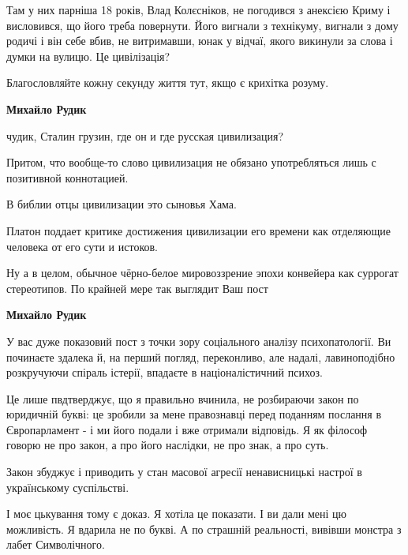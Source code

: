\begin{itemize}
Там у них парніша 18 років, Влад Колєсніков, не погодився з анексією Криму і
висловився, що його треба повернути. Його вигнали з технікуму, вигнали з дому
родичі і він себе вбив, не витримавши, юнак у відчаї, якого викинули за слова і
думки на вулицю. Це цивілізація?

Благословляйте кожну секунду життя тут, якщо є крихітка розуму.

\begin{itemize}

\textbf{Михайло Рудик} 

чудик, Сталин грузин, где он и где русская цивилизация?

Притом, что вообще-то слово цивилизация не обязано употребляться лишь с
позитивной коннотацией.

В библии отцы цивилизации это сыновья Хама.

Платон поддает критике достижения цивилизации его времени как отделяющие
человека от его сути и истоков.

Ну а в целом, обычное чёрно-белое мировоззрение эпохи конвейера как суррогат
стереотипов. По крайней мере так выглядит Ваш пост


\textbf{Михайло Рудик} 

У вас дуже показовий пост з точки зору соціального
аналізу психопатології. Ви починаєте здалека й, на перший погляд, переконливо,
але надалі, лавиноподібно розкручуючи спіраль істерії, впадаєте в
націоналістичний психоз. 

Це лише пвдтверджує, що я правильно вчинила, не розбираючи закон по юридичній
букві: це зробили за мене правознавці перед поданням послання в Європарламент -
і ми його подали і вже отримали відповідь.  Я як філософ говорю не про закон, а
про його наслідки, не про знак, а про суть.

Закон збуджує і приводить у стан масової агресії ненависницькі настрої в
українському суспільстві. 

І моє цькування тому є доказ. Я хотіла це показати. І ви дали мені цю
можливість. Я вдарила не по букві. А по страшній реальності, вивівши монстра з
лабет Символічного.




\end{itemize}
\end{itemize}
